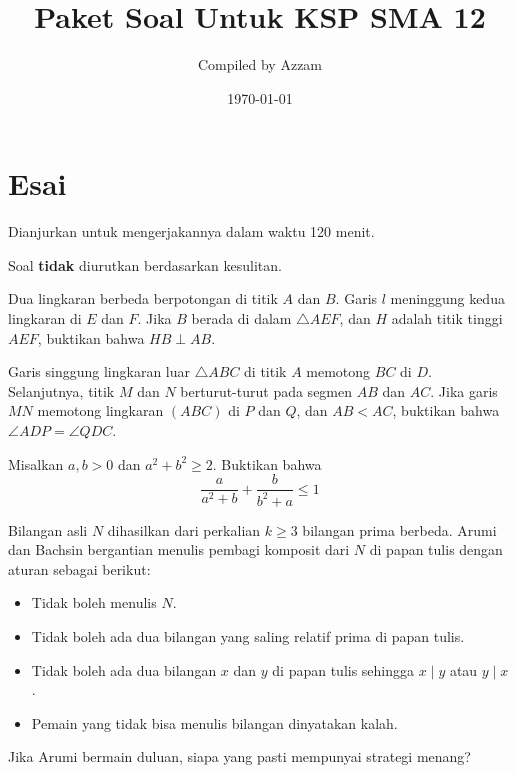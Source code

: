 \documentclass[12pt]{scrartcl}
\begin{document}
	\title{Paket Soal Untuk KSP SMA 12} %
	\date{\today}
	\author{Compiled by Azzam}
	\maketitle

\renewcommand*\contentsname{Daftar Isi}
\tableofcontents

\newpage
	

	\section{Esai}
	Dianjurkan untuk mengerjakannya dalam waktu 120 menit.
	
	Soal \textbf{tidak} diurutkan berdasarkan kesulitan. 
	
	\begin{soalbaru}
	Dua lingkaran berbeda berpotongan di titik $A$ dan $B$. Garis $l$ meninggung kedua lingkaran di $E$ dan $F$. Jika $B$ berada di dalam $\triangle AEF$, dan $H$ adalah titik tinggi $AEF$, buktikan bahwa $HB \perp AB$.
	\end{soalbaru}
	
	\begin{soalbaru}
	Garis singgung lingkaran luar $\triangle ABC$ di titik $A$ memotong $BC$ di $D$. Selanjutnya, titik $M$ dan $N$ berturut-turut pada segmen $AB$ dan $AC$. Jika garis $MN$ memotong lingkaran $(ABC)$  di $P$ dan $Q$, dan $AB < AC$, buktikan bahwa $\angle ADP = \angle QDC$.
	\end{soalbaru}
	
	\begin{soalbaru}
	Misalkan $a,b>0$ dan $a^2+b^2\geq 2.$ Buktikan bahwa $$\frac{a}{a^2+b}+\frac{b}{b^2+a}\leq1$$
	\end{soalbaru}
	
	\begin{soalbaru}
	Bilangan asli $N$ dihasilkan dari perkalian $k \ge 3$ bilangan prima berbeda. Arumi dan Bachsin bergantian menulis pembagi komposit dari $N$ di papan tulis dengan aturan sebagai berikut:
	\begin{itemize}
	\item Tidak boleh menulis $N$.
	\item Tidak boleh ada dua bilangan yang saling relatif prima di papan tulis.
	\item Tidak boleh ada dua bilangan $x$ dan $y$ di papan tulis sehingga $x \mid y$ atau $y \mid x$.
	\item Pemain yang tidak bisa menulis bilangan dinyatakan kalah.
	\end{itemize}
	
	Jika Arumi bermain duluan, siapa yang pasti mempunyai strategi menang?
	\end{soalbaru}
	
\end{document}
